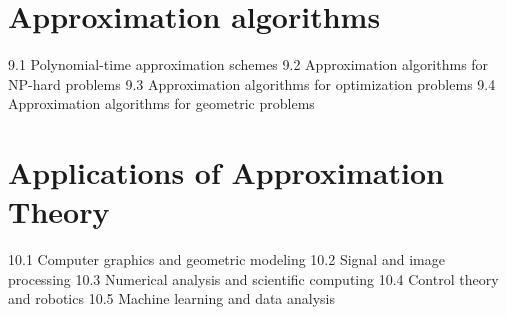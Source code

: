 \section{Approximation algorithms}
9.1 Polynomial-time approximation schemes
9.2 Approximation algorithms for NP-hard problems
9.3 Approximation algorithms for optimization problems
9.4 Approximation algorithms for geometric problems
\section{Applications of Approximation Theory}
10.1 Computer graphics and geometric modeling
10.2 Signal and image processing
10.3 Numerical analysis and scientific computing
10.4 Control theory and robotics
10.5 Machine learning and data analysis
